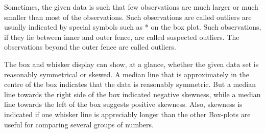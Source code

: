 \documentclass[
10pt, %
a4paper, %
]{report}
\begin{document}
Sometimes, the given data is such that few observations are much larger or much smaller than most of the observations. Such observations are called outliers are usually indicated by special symbols such as * on the box plot. Such observations, if they lie between inner and outer fence, are called suspected outliers. The observations beyond the outer fence are called outliers.

The box and whisker display can show, at a glance, whether the given data set is reasonably symmetrical or skewed. A median line that is approximately in the centre of the box indicates that the data is reasonably symmetric. But a median line towards the right side of the box indicated negative skewness, while a median line towards the left of the box suggests positive skewness. Also, skewness is indicated if one whisker line is appreciably longer than the other Box-plots are useful for comparing several groups of numbers.

\end{document}
